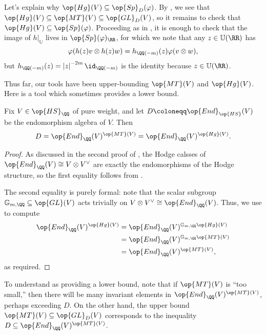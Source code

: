 \documentclass[../thesis.tex]{subfiles}
\begin{document}
\begin{remark} \label{rem:hg-commutes-polarization}
	Let's explain why $\op{Hg}(V)\subseteq\op{Sp}_D(\varphi)$. By , we see that $\op{Hg}(V)\subseteq\op{MT}(V)\subseteq\op{GL}_D(V)$, so it remains to check that $\op{Hg}(V)\subseteq\op{Sp}(\varphi)$. Proceeding as in , it is enough to check that the image of $h|_{\mathbb U}$ lives in $\op{Sp}(\varphi)_\RR$, for which we note that any $z\in\mathbb U(\RR)$ has
	\[\varphi(h(z)v\otimes h(z)w)=h_{\QQ(-m)}(z)\varphi(v\otimes w),\]
	but $h_{\QQ(-m)}(z)=\left|z\right|^{-2m}{\id_{\QQ(-m)}}$ is the identity because $z\in\mathbb U(\RR)$.
\end{remark}
Thus far, our tools have been upper-bounding $\op{MT}(V)$ and $\op{Hg}(V)$. Here is a tool which sometimes provides a lower bound.
\begin{lemma} \label{lem:mt-hg-fixes-endos}
	Fix $V\in\op{HS}_\QQ$ of pure weight, and let $D\coloneqq\op{End}_{\op{HS}}(V)$ be the endomorphism algebra of $V$. Then
	\[D=\op{End}_\QQ(V)^{\op{MT}(V)}=\op{End}_\QQ(V)^{\op{Hg}(V)}.\]
\end{lemma}
\begin{proof}
	As discussed in the second proof of , the Hodge calsses of $\op{End}_\QQ(V)\cong V\otimes V^\lor$ are exactly the endomorphisms of the Hodge structure, so the first equality follows from .

	The second equality is purely formal: note that the scalar subgroup $\mathbb G_{m,\QQ}\subseteq\op{GL}(V)$ acts trivially on $V\otimes V^\lor\cong\op{End}_\QQ(V)$. Thus, we use  to compute
	\begin{align*}
		\op{End}_\QQ(V)^{\op{Hg}(V)} &= \op{End}_\QQ(V)^{\mathbb G_{m,\QQ}\op{Hg}(V)} \\
		&= \op{End}_\QQ(V)^{\mathbb G_{m,\QQ}\op{MT}(V)} \\
		&= \op{End}_\QQ(V)^{\op{MT}(V)},
	\end{align*}
	as required.
\end{proof}
\begin{remark}
	To understand  as providing a lower bound, note that if $\op{MT}(V)$ is ``too small,'' then there will be many invariant elements in $\op{End}_\QQ(V)^{\op{MT}(V)}$, perhaps exceeding $D$. On the other hand, the upper bound $\op{MT}(V)\subseteq\op{GL}_D(V)$ corresponds to the inequality $D\subseteq\op{End}_\QQ(V)^{\op{MT}(V)}$.
\end{remark}
\end{document}
